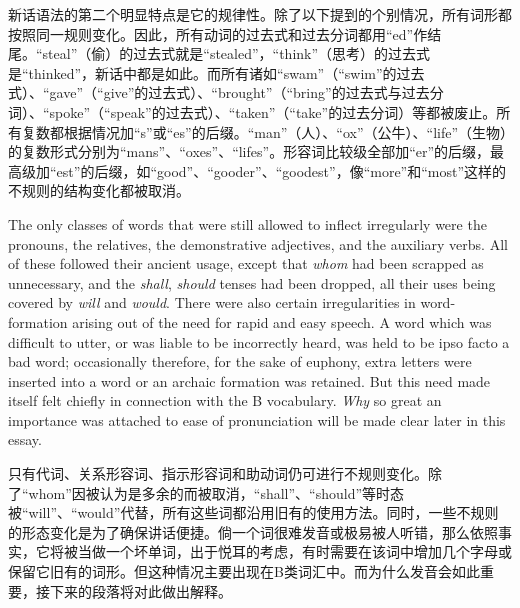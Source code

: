 \begin{paracol}{2}
\switchcolumn

新话语法的第二个明显特点是它的规律性。除了以下提到的个别情况，所有词形都按照同一规则变化。因此，所有动词的过去式和过去分词都用``ed''作结尾。``steal''（偷）的过去式就是``stealed''，``think''（思考）的过去式是``thinked''，新话中都是如此。而所有诸如``swam''（``swim''的过去式）、``gave''（``give''的过去式）、``brought''（``bring''的过去式与过去分词）、``spoke''（``speak''的过去式）、``taken''（``take''的过去分词）等都被废止。所有复数都根据情况加``s''或``es''的后缀。``man''（人）、``ox''（公牛）、``life''（生物）的复数形式分别为``mans''、``oxes''、``lifes''。形容词比较级全部加``er''的后缀，最高级加``est''的后缀，如``good''、``gooder''、``goodest''，像``more''和``most''这样的不规则的结构变化都被取消。

\switchcolumn*

The only classes of words that were still allowed to inflect irregularly
were the pronouns, the relatives, the demonstrative adjectives, and the
auxiliary verbs. All of these followed their ancient usage, except that
\emph{whom} had been scrapped as unnecessary, and the \emph{shall},
\emph{should} tenses had been dropped, all their uses being covered by
\emph{will} and \emph{would}. There were also certain irregularities in
word-formation arising out of the need for rapid and easy speech. A word
which was difficult to utter, or was liable to be incorrectly heard, was
held to be ipso facto a bad word; occasionally therefore, for the sake
of euphony, extra letters were inserted into a word or an archaic
formation was retained. But this need made itself felt chiefly in
connection with the B vocabulary. \emph{Why} so great an importance was
attached to ease of pronunciation will be made clear later in this
essay.

\switchcolumn

只有代词、关系形容词、指示形容词和助动词仍可进行不规则变化。除了``whom''因被认为是多余的而被取消，``shall''、``should''等时态被``will''、``would''代替，所有这些词都沿用旧有的使用方法。同时，一些不规则的形态变化是为了确保讲话便捷。倘一个词很难发音或极易被人听错，那么依照事实，它将被当做一个坏单词，出于悦耳的考虑，有时需要在该词中增加几个字母或保留它旧有的词形。但这种情况主要出现在B类词汇中。而为什么发音会如此重要，接下来的段落将对此做出解释。

\switchcolumn*

\sectionbreak

\switchcolumn

\sectionbreak

\switchcolumn*


\end{paracol}
